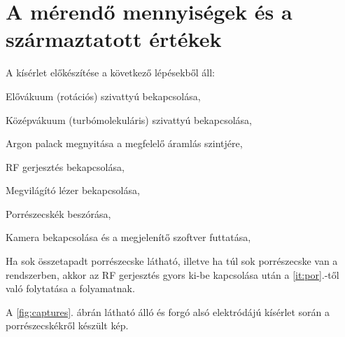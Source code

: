 \clearpage

	
\section{A mérendő mennyiségek és a származtatott értékek}
	A kísérlet előkészítése a következő lépésekből áll:
	\begin{enumerate*}
		\item Elővákuum (rotációs) szivattyú bekapcsolása,
		\item Középvákuum (turbómolekuláris) szivattyú bekapcsolása,
		\item Argon palack megnyitása a megfelelő áramlás szintjére,
		\item RF gerjesztés bekapcsolása,
		\item Megvilágító lézer bekapcsolása,
		\item \label{it:por} Porrészecskék beszórása,
		\item Kamera bekapcsolása és a megjelenítő szoftver futtatása,
		\item Ha sok összetapadt porrészecske látható, illetve
                  ha túl sok porrészecske van a rendszerben, akkor
		az RF gerjesztés gyors ki-be kapcsolása után a \ref{it:por}.-től való folytatása a folyamatnak.
	\end{enumerate*}
	A \ref{fig:captures}. ábrán látható álló és forgó alsó elektródájú kísérlet során a
	porrészecskékről készült kép.
	
